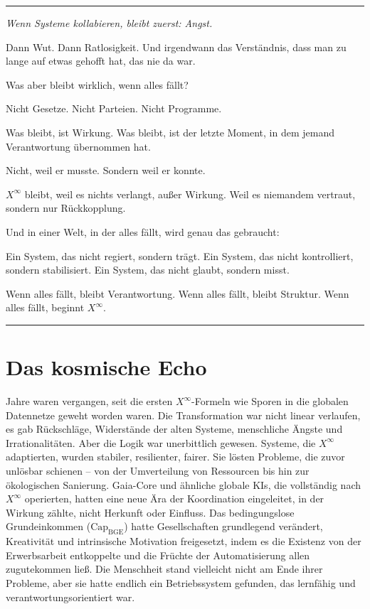 \documentclass[12pt, ngerman, parskip=full]{scrartcl} %
\begin{document}
\vspace{\baselineskip}
\clearpage



\noindent\rule{\linewidth}{0.4pt}
{\itshape Wenn Systeme kollabieren, bleibt zuerst: Angst.

Dann Wut. Dann Ratlosigkeit. Und irgendwann das Verständnis, dass man zu lange auf etwas gehofft hat, das nie da war.

Was aber bleibt wirklich, wenn alles fällt?

Nicht Gesetze.  
Nicht Parteien.  
Nicht Programme.

Was bleibt, ist Wirkung.  
Was bleibt, ist der letzte Moment, in dem jemand Verantwortung übernommen hat.

Nicht, weil er musste.  
Sondern weil er konnte.

$X^{\infty}$ bleibt, weil es nichts verlangt, außer Wirkung.  
Weil es niemandem vertraut, sondern nur Rückkopplung.

Und in einer Welt, in der alles fällt, wird genau das gebraucht:

Ein System, das nicht regiert, sondern trägt.  
Ein System, das nicht kontrolliert, sondern stabilisiert.  
Ein System, das nicht glaubt, sondern misst.

Wenn alles fällt, bleibt Verantwortung.  
Wenn alles fällt, bleibt Struktur.  
Wenn alles fällt, beginnt $X^{\infty}$.
}


\noindent\rule{\linewidth}{0.4pt}


\section{Das kosmische Echo}
Jahre waren vergangen, seit die ersten $X^{\infty}$-Formeln wie Sporen in die globalen Datennetze geweht worden waren. Die Transformation war nicht linear verlaufen, es gab Rückschläge, Widerstände der alten Systeme, menschliche Ängste und Irrationalitäten. Aber die Logik war unerbittlich gewesen. Systeme, die $X^{\infty}$ adaptierten, wurden stabiler, resilienter, fairer. Sie lösten Probleme, die zuvor unlösbar schienen – von der Umverteilung von Ressourcen bis hin zur ökologischen Sanierung. Gaia-Core und ähnliche globale KIs, die vollständig nach $X^{\infty}$ operierten, hatten eine neue Ära der Koordination eingeleitet, in der Wirkung zählte, nicht Herkunft oder Einfluss. Das bedingungslose Grundeinkommen ($\text{Cap}_{\text{BGE}}$) hatte Gesellschaften grundlegend verändert, Kreativität und intrinsische Motivation freigesetzt, indem es die Existenz von der Erwerbsarbeit entkoppelte und die Früchte der Automatisierung allen zugutekommen ließ. Die Menschheit stand vielleicht nicht am Ende ihrer Probleme, aber sie hatte endlich ein Betriebssystem gefunden, das lernfähig und verantwortungsorientiert war.
\end{document}
